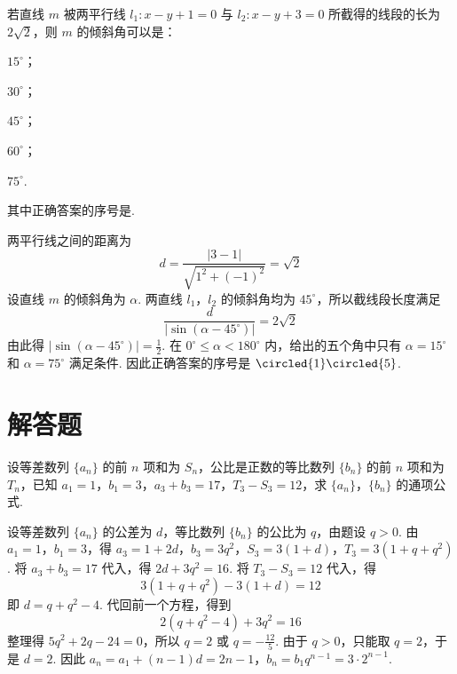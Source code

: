 \begin{problem}
若直线 \(m\) 被两平行线 \(l_{1}: x - y + 1 = 0\) 与 \(l_{2}: x - y + 3 = 0\) 所截得的线段的长为 \(2\sqrt{2}\)，则 \(m\) 的倾斜角可以是：

\begin{circlelist}
\item \(15^{\circ}\)；
\item \(30^{\circ}\)；
\item \(45^{\circ}\)；
\item \(60^{\circ}\)；
\item \(75^{\circ}\).
\end{circlelist}

其中正确答案的序号是\fillinblank{}.
\end{problem}

\begin{answer}
\end{answer}

\begin{solution}
两平行线之间的距离为
\[
d=\frac{|3-1|}{\sqrt{1^2+(-1)^2}}=\sqrt{2}
\]
设直线 \(m\) 的倾斜角为 \(\alpha\). 两直线 \(l_1\)，\(l_2\) 的倾斜角均为 \(45^{\circ}\)，所以截线段长度满足
\[
\frac{d}{|\sin(\alpha-45^{\circ})|}=2\sqrt{2}
\]
由此得 \(|\sin(\alpha-45^{\circ})|=\frac{1}{2}\). 在 \(0^{\circ}\leqslant\alpha<180^{\circ}\) 内，给出的五个角中只有 \(\alpha=15^{\circ}\) 和 \(\alpha=75^{\circ}\) 满足条件. 因此正确答案的序号是 \(\circled{1}\circled{5}\).
\end{solution}

\section{解答题}

\begin{problem}
设等差数列 \(\{a_{n}\}\) 的前 \(n\) 项和为 \(S_{n}\)，公比是正数的等比数列 \(\{b_{n}\}\) 的前 \(n\) 项和为 \(T_{n}\)，已知 \(a_{1} = 1\)，\(b_{1} = 3\)，\(a_{3} + b_{3} = 17\)，\(T_{3} - S_{3} = 12\)，求 \(\{a_{n}\}\)，\(\{b_{n}\}\) 的通项公式.
\end{problem}

\begin{solution}
设等差数列 \(\{a_n\}\) 的公差为 \(d\)，等比数列 \(\{b_n\}\) 的公比为 \(q\)，由题设 \(q>0\). 由 \(a_1=1\)，\(b_1=3\)，得
\(a_3=1+2d\)，\(b_3=3q^2\)，\(S_3=3(1+d)\)，\(T_3=3(1+q+q^2)\).
将 \(a_3+b_3=17\) 代入，得 \(2d+3q^2=16\). 将 \(T_3-S_3=12\) 代入，得
\[
3(1+q+q^2)-3(1+d)=12
\]
即 \(d=q+q^2-4\). 代回前一个方程，得到
\[
2(q+q^2-4)+3q^2=16
\]
整理得 \(5q^2+2q-24=0\)，所以 \(q=2\) 或 \(q=-\frac{12}{5}\). 由于 \(q>0\)，只能取 \(q=2\)，于是 \(d=2\). 因此
\(a_n=a_1+(n-1)d=2n-1\)，\(b_n=b_1q^{n-1}=3\cdot2^{n-1}\).
\end{solution}

